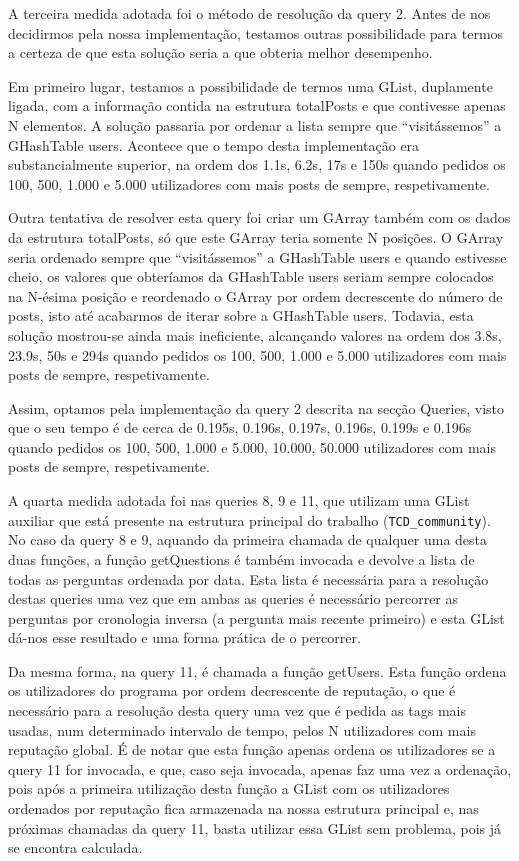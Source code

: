 \documentclass[a4paper]{article}
\begin{document}
A terceira medida adotada foi o método de resolução da query 2. Antes de nos decidirmos
pela nossa implementação, testamos outras possibilidade para termos a certeza de que
esta solução seria a que obteria melhor desempenho.\par
Em primeiro lugar, testamos a possibilidade de termos uma GList, duplamente ligada,
com a informação contida na estrutura totalPosts e que contivesse apenas N elementos.
A solução passaria por ordenar a lista sempre que ``visitássemos'' a GHashTable users.
Acontece que o tempo desta implementação era substancialmente superior, na ordem dos
1.1s, 6.2s, 17s e 150s quando pedidos os 100,
500, 1.000 e 5.000 utilizadores com mais posts de sempre, respetivamente. \par
Outra tentativa de resolver esta query foi criar um GArray também com os dados
da estrutura totalPosts, só que este GArray teria somente N posições. O GArray
seria ordenado sempre que ``visitássemos'' a GHashTable users e quando estivesse
cheio, os valores que obteríamos da GHashTable users seriam sempre colocados na
N-ésima posição e reordenado o GArray por ordem decrescente do número de posts,
isto até acabarmos de iterar sobre a GHashTable users. Todavia, esta solução
mostrou-se ainda mais ineficiente, alcançando valores na ordem dos 3.8s, 23.9s,
50s e 294s quando pedidos os 100, 500, 1.000 e 5.000 utilizadores com mais posts
de sempre, respetivamente. \par
Assim, optamos pela implementação da query 2 descrita na secção Queries, visto que
o seu tempo é de cerca de 0.195s, 0.196s, 0.197s, 0.196s, 0.199s e 0.196s
quando pedidos os 100, 500, 1.000 e 5.000, 10.000, 50.000 utilizadores com mais
posts de sempre, respetivamente.

A quarta medida adotada foi nas queries 8, 9 e 11, que utilizam uma GList auxiliar
que está presente na estrutura principal do trabalho (\texttt{TCD\_community}).
No caso da query 8 e 9, aquando da primeira chamada de qualquer uma desta duas funções,
a função getQuestions é também invocada e devolve a lista de todas as perguntas
ordenada por data. Esta lista é necessária para a resolução destas queries
uma vez que em ambas as queries é necessário percorrer as perguntas por
cronologia inversa (a pergunta mais recente primeiro) e esta GList dá-nos esse resultado
e uma forma prática de o percorrer.

Da mesma forma, na query 11, é chamada a função getUsers. Esta função ordena os
utilizadores do programa por ordem decrescente de reputação, o que é necessário
para a resolução desta query uma vez que é pedida as tags mais usadas,
num determinado intervalo de tempo, pelos N utilizadores com mais reputação global.
É de notar que esta função apenas ordena os utilizadores se a query 11 for invocada,
e que, caso seja invocada, apenas faz uma vez a ordenação, pois após a
primeira utilização desta função a GList com os utilizadores ordenados por reputação
fica armazenada na nossa estrutura principal e, nas próximas chamadas da query 11,
basta utilizar essa GList sem problema, pois já se encontra calculada.
\end{document}
